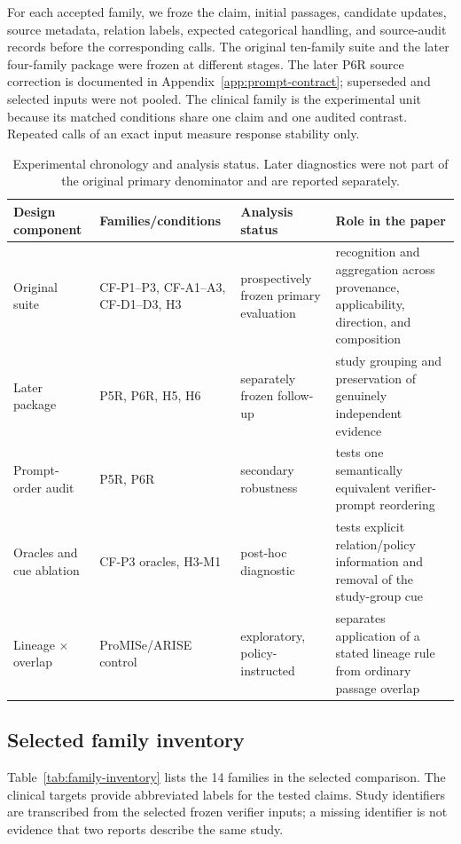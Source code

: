 \documentclass[11pt]{article}
\begin{document}
For each accepted family, we froze the claim, initial passages, candidate updates, source metadata, relation labels, expected categorical handling, and source-audit records before the corresponding calls. The original ten-family suite and the later four-family package were frozen at different stages. The later P6R source correction is documented in Appendix~\ref{app:prompt-contract}; superseded and selected inputs were not pooled. The clinical family is the experimental unit because its matched conditions share one claim and one audited contrast. Repeated calls of an exact input measure response stability only.

\begin{table}[t]
\centering
\small
\begin{tabularx}{\textwidth}{@{}l l X X@{}}
\toprule
Design component & Families/conditions & Analysis status & Role in the paper \\
\midrule
Original suite & CF-P1--P3, CF-A1--A3, CF-D1--D3, H3 & prospectively frozen primary evaluation & recognition and aggregation across provenance, applicability, direction, and composition \\
Later package & P5R, P6R, H5, H6 & separately frozen follow-up & study grouping and preservation of genuinely independent evidence \\
Prompt-order audit & P5R, P6R & secondary robustness & tests one semantically equivalent verifier-prompt reordering \\
Oracles and cue ablation & CF-P3 oracles, H3-M1 & post-hoc diagnostic & tests explicit relation/policy information and removal of the study-group cue \\
Lineage $\times$ overlap & ProMISe/ARISE control & exploratory, policy-instructed & separates application of a stated lineage rule from ordinary passage overlap \\
\bottomrule
\end{tabularx}
\caption{Experimental chronology and analysis status. Later diagnostics were not part of the original primary denominator and are reported separately.}
\label{tab:study-chronology}
\end{table}

\subsection{Selected family inventory}

Table~\ref{tab:family-inventory} lists the 14 families in the selected comparison. The clinical targets provide abbreviated labels for the tested claims. Study identifiers are transcribed from the selected frozen verifier inputs; a missing identifier is not evidence that two reports describe the same study.
\end{document}
